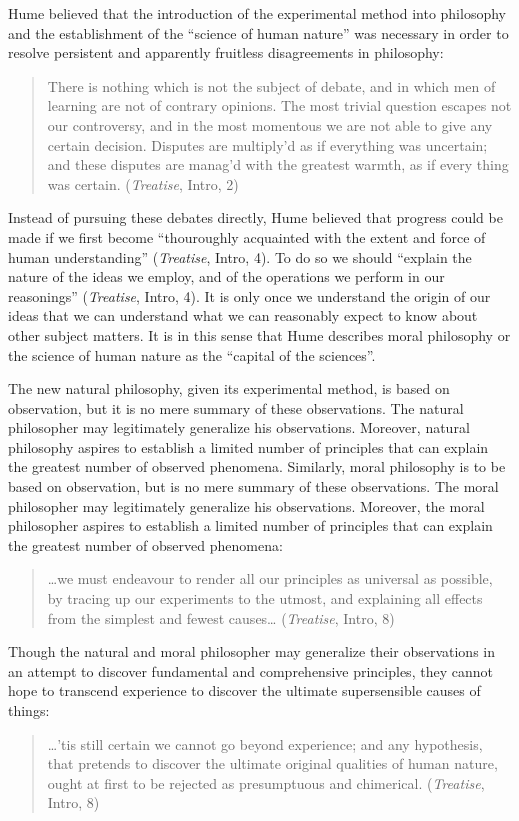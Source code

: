 Hume believed that the introduction of the experimental method into philosophy and the establishment of the ``science of human nature'' was necessary in order to resolve persistent and apparently fruitless disagreements in philosophy:
\begin{quote}
    There is nothing which is not the subject of debate, and in which men of learning are not of contrary opinions. The most trivial question escapes not our controversy, and in the most momentous we are not able to give any certain decision. Disputes are multiply’d as if everything was uncertain; and these disputes are manag’d with the greatest warmth, as if every thing was certain. (\emph{Treatise}, Intro, 2)
\end{quote}

Instead of pursuing these debates directly, Hume believed that progress could be made if we first become ``thouroughly acquainted with the extent and force of human understanding'' (\emph{Treatise}, Intro, 4). To do so we should ``explain the nature of the ideas we employ, and of the operations we perform in our reasonings'' (\emph{Treatise}, Intro, 4). It is only once we understand the origin of our ideas that we can understand what we can reasonably expect to know about other subject matters. It is in this sense that Hume describes moral philosophy or the science of human nature as the ``capital of the sciences''.

The new natural philosophy, given its experimental method, is based on observation, but it is no mere summary of these observations. The natural philosopher may legitimately generalize his observations. Moreover, natural philosophy aspires to establish a limited number of principles that can explain the greatest number of observed phenomena. Similarly, moral philosophy is to be based on observation, but is no mere summary of these observations. The moral philosopher may legitimately generalize his observations. Moreover, the moral philosopher aspires to establish a limited number of principles that can explain the greatest number of observed phenomena:
\begin{quote}
    \ldots we must endeavour to render all our principles as universal as possible, by tracing up our experiments to the utmost, and explaining all effects from the simplest and fewest causes… (\emph{Treatise}, Intro, 8)
\end{quote}
Though the natural and moral philosopher may generalize their observations in an attempt to discover fundamental and comprehensive principles, they cannot hope to transcend experience to discover the ultimate supersensible causes of things:
\begin{quote}
    \ldots 'tis still certain we cannot go beyond experience; and any hypothesis, that pretends to discover the ultimate original qualities of human nature, ought at first to be rejected as presumptuous and chimerical. (\emph{Treatise}, Intro, 8)
\end{quote}

